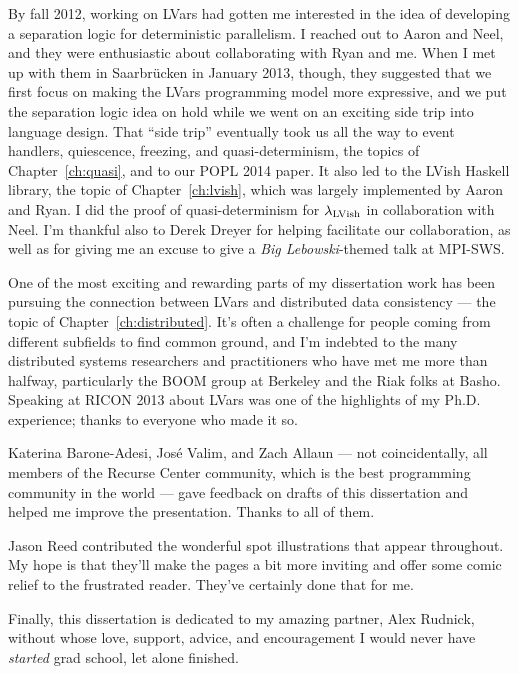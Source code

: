 By fall 2012, working on LVars had gotten me interested in the idea of developing a separation logic for deterministic parallelism.  I reached out to Aaron and Neel, and they were enthusiastic about collaborating with Ryan and me.  When I met up with them in Saarbr{\"u}cken in January 2013, though, they suggested that we first focus on making the LVars programming model more expressive, and we put the separation logic idea on hold while we went on an exciting side trip into language design.  That ``side trip'' eventually took us all the way to event handlers, quiescence, freezing, and quasi-determinism, the topics of Chapter~\ref{ch:quasi}, and to our POPL 2014 paper.  It also led to the LVish Haskell library, the topic of Chapter~\ref{ch:lvish}, which was largely implemented by Aaron and Ryan.  I did the proof of quasi-determinism for $\lambda_{\textrm{LVish}}$ in collaboration with Neel.  I'm thankful also to Derek Dreyer for helping facilitate our collaboration, as well as for giving me an excuse to give a \emph{Big Lebowski}-themed talk at MPI-SWS.

One of the most exciting and rewarding parts of my dissertation work has been pursuing the connection between LVars and distributed data consistency --- the topic of Chapter~\ref{ch:distributed}.  It's often a challenge for people coming from different subfields to find common ground, and I'm indebted to the many distributed systems researchers and practitioners who have met me more than halfway, particularly the BOOM group at Berkeley and the Riak folks at Basho.  Speaking  at RICON 2013 about LVars was one of the highlights of my Ph.D. experience; thanks to everyone who made it so.

Katerina Barone-Adesi, Jos\'{e} Valim, and Zach Allaun --- not coincidentally, all members of the Recurse Center community, which is the best programming community in the world --- gave feedback on drafts of this dissertation and helped me improve the presentation.  Thanks to all of them.

Jason Reed contributed the wonderful spot illustrations that appear throughout.  My hope is that they'll make the pages a bit more inviting and offer some comic relief to the frustrated reader.  They've certainly done that for me.

Finally, this dissertation is dedicated to my amazing partner, Alex Rudnick, without whose love, support, advice, and encouragement I would never have \emph{started} grad school, let alone finished.
